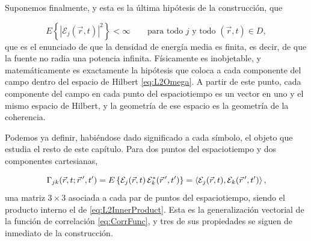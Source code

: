 		Suponemos finalmente, y esta es la última hipótesis de la construcción, que

		\begin{equation}\label{eq:FiniteEnergy}
			E\left\{\left|\mathcal{E}_{j}(\vec{r},t)\right|^{2}\right\}<\infty
			\qquad \text{para todo } j \text{ y todo } (\vec{r},t)\in D,
		\end{equation}
		que es el enunciado de que la densidad de energía media es finita, es decir, de que la fuente no radia una potencia infinita. Físicamente es inobjetable, y matemáticamente es exactamente la hipótesis que coloca a cada componente del campo dentro del espacio de Hilbert \eqref{eq:L2Omega}. A partir de este punto, cada componente del campo en cada punto del espaciotiempo es un vector en uno y el mismo espacio de Hilbert, y la geometría de ese espacio es la geometría de la coherencia.

		Podemos ya definir, habiéndose dado significado a cada símbolo, el objeto que estudia el resto de este capítulo. Para dos puntos del espaciotiempo y dos componentes cartesianas,

		\begin{equation}\label{eq:CoherenceTensor}
			\Gamma_{jk}(\vec{r},t;\vec{r}\,',t') = E\left\{\mathcal{E}_{j}(\vec{r},t)\,\mathcal{E}_{k}^{*}(\vec{r}\,',t')\right\}
			= \braket{\mathcal{E}_{j}(\vec{r},t),\mathcal{E}_{k}(\vec{r}\,',t')},
		\end{equation}
		una matriz $3\times3$ asociada a cada par de puntos del espaciotiempo, siendo el producto interno el de \eqref{eq:L2InnerProduct}. Esta es la generalización vectorial de la función de correlación \eqref{eq:CorrFunc}, y tres de sus propiedades se siguen de inmediato de la construcción.

